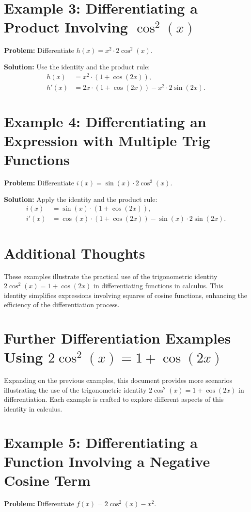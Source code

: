 \documentclass[a4paper,12pt]{book}
\newcounter{example}
\begin{document}
\section*{Example 3: Differentiating a Product Involving \(\cos^2(x)\)}
\textbf{Problem:} Differentiate \(h(x) = x^2 \cdot 2 \cos^2(x)\).

\textbf{Solution:}
Use the identity and the product rule:
\begin{align*}
h(x) &= x^2 \cdot (1 + \cos(2x)), \\
h'(x) &= 2x \cdot (1 + \cos(2x)) - x^2 \cdot 2 \sin(2x).
\end{align*}

\section*{Example 4: Differentiating an Expression with Multiple Trig Functions}
\textbf{Problem:} Differentiate \(i(x) = \sin(x) \cdot 2 \cos^2(x)\).

\textbf{Solution:}
Apply the identity and the product rule:
\begin{align*}
i(x) &= \sin(x) \cdot (1 + \cos(2x)), \\
i'(x) &= \cos(x) \cdot (1 + \cos(2x)) - \sin(x) \cdot 2 \sin(2x).
\end{align*}

\section*{Additional Thoughts}
These examples illustrate the practical use of the trigonometric identity \(2 \cos^2(x) = 1 + \cos(2x)\) in differentiating functions in calculus. This identity simplifies expressions involving squares of cosine functions, enhancing the efficiency of the differentiation process.

\section*{Further Differentiation Examples Using \(2 \cos^2(x) = 1 + \cos(2x)\)}
Expanding on the previous examples, this document provides more scenarios illustrating the use of the trigonometric identity \(2 \cos^2(x) = 1 + \cos(2x)\) in differentiation. Each example is crafted to explore different aspects of this identity in calculus.

\section*{Example 5: Differentiating a Function Involving a Negative Cosine Term}
\textbf{Problem:} Differentiate \(f(x) = 2 \cos^2(x) - x^2\).
\end{document}
